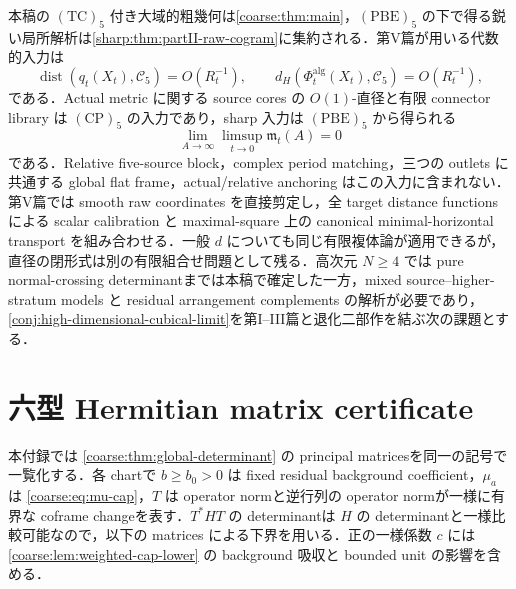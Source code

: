 \documentclass[a4paper,11pt]{ltjsarticle}
\numberwithin{equation}{section}
\theoremstyle{plain}
\theoremstyle{definition}
\theoremstyle{remark}
\newcommand{\Cfive}{\mathcal C_5}\newcommand{\dsq}{d_{\square}}\newcommand{\Lt}{L_t}\newcommand{\Rt}{R_t}
\begin{document}
本稿の $\mathrm{(TC)}_5$ 付き大域的粗幾何は\cref{coarse:thm:main}，$\mathrm{(PBE)}_5$ の下で得る鋭い局所解析は\cref{sharp:thm:partII-raw-cogram}に集約される．第V篇が用いる代数的入力は
\[
 \operatorname{dist}(q_t(X_t),\Cfive)=O(R_t^{-1}),\qquad
 d_H(\Phi_t^{\mathrm{alg}}(X_t),\Cfive)=O(R_t^{-1}),
\]
である．Actual metric に関する source cores の $O(1)$-直径と有限 connector library は $\mathrm{(CP)}_5$ の入力であり，sharp 入力は $\mathrm{(PBE)}_5$ から得られる
\[
 \lim_{A\to\infty}\limsup_{t\to0}\mathfrak m_t(A)=0
\]
である．Relative five-source block，complex period matching，三つの outlets に共通する global flat frame，actual/relative anchoring はこの入力に含まれない．第V篇では smooth raw coordinates を直接剪定し，全 target distance functions による scalar calibration と maximal-square 上の canonical minimal-horizontal transport を組み合わせる．一般 $d$ についても同じ有限複体論が適用できるが，直径の閉形式は別の有限組合せ問題として残る．高次元 $N\ge4$ では pure normal-crossing determinantまでは本稿で確定した一方，mixed source--higher-stratum models と residual arrangement complements の解析が必要であり，\cref{conj:high-dimensional-cubical-limit}を第I--III篇と退化二部作を結ぶ次の課題とする．

\appendix
\section{六型 Hermitian matrix certificate}\label{coarse:app:model-table}

本付録では \cref{coarse:thm:global-determinant} の principal matricesを同一の記号で一覧化する．各 chartで $b\ge b_0>0$ は fixed residual background coefficient，$\mu_a$ は \eqref{coarse:eq:mu-cap}，$T$ は operator normと逆行列の operator normが一様に有界な coframe changeを表す．$T^*HT$ の determinantは $H$ の determinantと一様比較可能なので，以下の matrices による下界を用いる．正の一様係数 $c$ には \cref{coarse:lem:weighted-cap-lower} の background 吸収と bounded unit の影響を含める．
\end{document}
